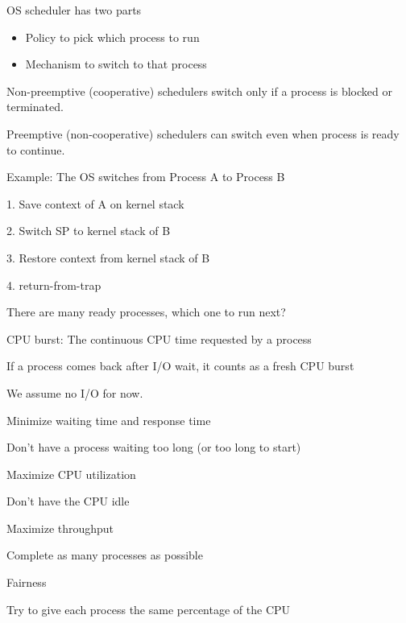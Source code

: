 \begin{slide}

	
	OS scheduler has two parts
	\begin{itemize}
		\item Policy to pick which process to run
		\item Mechanism to switch to that process
	\end{itemize}
	\bigskip
	
	Non-preemptive (cooperative) schedulers switch only if a process is blocked or terminated.
	\bigskip
	
	Preemptive (non-cooperative) schedulers can switch even when process is ready to continue.
	
\end{slide}

\begin{slide}

	
	Example: The OS switches from Process A to Process B
	\bigskip
	
	1. Save context of A on kernel stack
	\bigskip
	
	2. Switch SP to kernel stack of B
	\bigskip
	
	3. Restore context from kernel stack of B
	\bigskip
	
	4. return-from-trap
	
\end{slide}

\begin{slide}

	
	There are many ready processes, which one to run next?
	\bigskip
	
	CPU burst: The continuous CPU time requested by a process
	\medskip
	
	If a process comes back after I/O wait, it counts as a fresh CPU burst
	\bigskip
	
	We assume no I/O for now.
		
\end{slide}

  \begin{slide}


    Minimize waiting time and response time

    \leftspace{}Don't have a process waiting too long (or too long to start)
    \medskip

    Maximize CPU utilization

    \leftspace{}Don't have the CPU idle
    \medskip

    Maximize throughput

    \leftspace{}Complete as many processes as possible
    \medskip

    Fairness

    \leftspace{}Try to give each process the same percentage of the CPU

  \end{slide}

